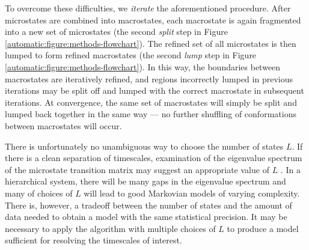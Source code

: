 To overcome these difficulties, we \emph{iterate} the aforementioned procedure.
After microstates are combined into macrostates, each macrostate is again fragmented into a new set of microstates (the second \emph{split} step in Figure \ref{automatic:figure:methods-flowchart}).
The refined set of all microstates is then lumped to form refined macrostates (the second \emph{lump} step in Figure \ref{automatic:figure:methods-flowchart}).
In this way, the boundaries between macrostates are iteratively refined, and regions incorrectly lumped in previous iterations may be split off and lumped with the correct macrostate in subsequent iterations.
At convergence, the same set of macrostates will simply be split and lumped back together in the same way --- no further shuffling of conformations between macrostates will occur.

There is unfortunately no unambiguous way to choose the number of states $L$.
If there is a clean separation of timescales, examination of the eigenvalue spectrum of the microstate transition matrix may suggest an appropriate value of $L$ \cite{schuette:2002b}.
In a hierarchical system, there will be many gaps in the eigenvalue spectrum and many of choices of $L$ will lead to good Markovian models of varying complexity.
There is, however, a tradeoff between the number of states and the amount of data needed to obtain a model with the same statistical precision.
It may be necessary to apply the algorithm with multiple choices of $L$ to produce a model sufficient for resolving the timescales of interest.


